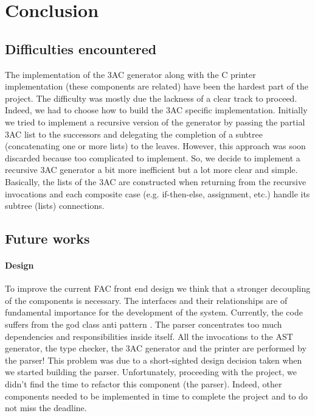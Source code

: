 \section{Conclusion}
\subsection{Difficulties encountered}
The implementation of the 3AC generator along with the C printer implementation 
(these components are related) have been the hardest part of the project. The 
difficulty was mostly due the lackness of a clear track to proceed. Indeed, we
had to choose how to build the 3AC specific implementation. Initially we tried
to implement a recursive version of the generator by passing the partial 3AC 
list to the successors and delegating the completion of a subtree 
(concatenating one or more lists) to the leaves. However, this approach was soon 
discarded because too complicated to implement. So, we decide to implement a 
recursive 3AC generator a bit more inefficient but a lot more clear and simple. 
Basically, the lists of the 3AC are constructed when returning from the 
recursive invocations and each composite case (e.g. if-then-else, assignment, 
etc.) handle its subtree (lists) connections.
\subsection{Future works}
\paragraph{Design}
To improve the current FAC front end design we think that a stronger decoupling 
of the components is necessary. The interfaces and their relationships are of 
fundamental importance for the development of the system. Currently, the code 
suffers from the god class anti pattern \cite{Martin:2008:CCH:1388398}. 
The parser concentrates too much dependencies and responsibilities inside 
itself. All the invocations to the AST generator, the type checker, the 3AC 
generator and the printer are performed by the parser! This problem was due to a
short-sighted design decision taken when we started building the parser. 
Unfortunately, proceeding with the project, we didn't find the time to refactor 
this component (the parser). Indeed, other components needed to be implemented 
in time to complete the project and to do not miss the deadline.

